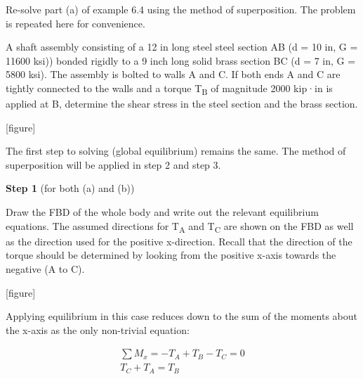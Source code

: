\documentclass[
  letterpaper,
  DIV=11,
  numbers=noendperiod]{scrreprt}
\theoremstyle{definition}
\theoremstyle{remark}
\begin{document}
\begin{tcolorbox}[enhanced jigsaw, leftrule=.75mm, colbacktitle=quarto-callout-tip-color!10!white, breakable, opacityback=0, colback=white, titlerule=0mm, toprule=.15mm, colframe=quarto-callout-tip-color-frame, coltitle=black, title={Example 6.5}, toptitle=1mm, bottomrule=.15mm, rightrule=.15mm, left=2mm, arc=.35mm, opacitybacktitle=0.6, bottomtitle=1mm]

Re-solve part (a) of example 6.4 using the method of superposition. The
problem is repeated here for convenience.

A shaft assembly consisting of a 12 in long steel steel section AB (d =
10 in, G = 11600 ksi)) bonded rigidly to a 9 inch long solid brass
section BC (d = 7 in, G = 5800 ksi). The assembly is bolted to walls A
and C. If both ends A and C are tightly connected to the walls and a
torque T\textsubscript{B} of magnitude 2000 kip·in is applied at B,
determine the shear stress in the steel section and the brass section.

{[}figure{]}

\begin{tcolorbox}[enhanced jigsaw, leftrule=.75mm, colbacktitle=quarto-callout-tip-color!10!white, breakable, opacityback=0, colback=white, titlerule=0mm, toprule=.15mm, colframe=quarto-callout-tip-color-frame, coltitle=black, title={Solution}, toptitle=1mm, bottomrule=.15mm, rightrule=.15mm, left=2mm, arc=.35mm, opacitybacktitle=0.6, bottomtitle=1mm]

The first step to solving (global equilibrium) remains the same. The
method of superposition will be applied in step 2 and step 3.

\textbf{Step 1} (for both (a) and (b))

Draw the FBD of the whole body and write out the relevant equilibrium
equations. The assumed directions for T\textsubscript{A} and
T\textsubscript{C} are shown on the FBD as well as the direction used
for the positive x-direction. Recall that the direction of the torque
should be determined by looking from the positive x-axis towards the
negative (A to C).

{[}figure{]}

Applying equilibrium in this case reduces down to the sum of the moments
about the x-axis as the only non-trivial equation:

\[
\begin{gathered}
\sum M_x=-T_A+T_B-T_C=0 \\
T_C+T_A=T_B
\end{gathered}
\]


\end{tcolorbox}
\end{tcolorbox}
\end{document}
